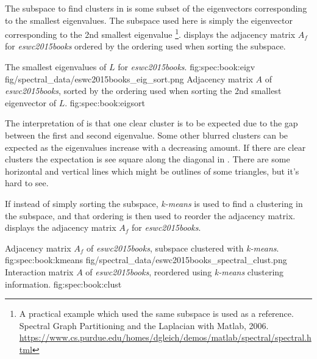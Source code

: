 The subspace to find clusters in is some subset of the eigenvectors corresponding to the smallest eigenvalues. The subspace used here is simply the eigenvector corresponding to the 2nd smallest eigenvalue \footnote{A practical example which used the same subspace is used as a reference. \\
Spectral Graph Partitioning and the Laplacian with Matlab, 2006. \\
\url{https://www.cs.purdue.edu/homes/dgleich/demos/matlab/spectral/spectral.html}
}.
 displays the adjacency matrix $A_f$ for \textit{eswc2015books} ordered by the ordering used when sorting the subspace. 


\FloatBarrier

{The smallest eigenvalues of $L$ for \textit{eswc2015books}.}
{fig:spec:book:eigv}
{fig/spectral_data/eswc2015books_eig_sort.png}
{Adjacency matrix $A$ of \textit{eswc2015books}, sorted by the ordering used when sorting the 2nd smallest eigenvector of $L$.}
{fig:spec:book:eigsort}

The interpretation of  is that one clear cluster is to be expected due to the gap between the first and second eigenvalue. Some other blurred clusters can be expected as the eigenvalues increase with a decreasing amount. If there are clear clusters the expectation is see square along the diagonal in . There are some horizontal and vertical lines which might be outlines of some triangles, but it's hard to see.

If instead of simply sorting the subspace, \textit{k-means} is used to find a clustering in the subspace, and that ordering is then used to reorder the adjacency matrix.  displays the adjacency matrix $A_f$ for \textit{eswc2015books}. 

\FloatBarrier

{Adjacency matrix $A_f$ of \textit{eswc2015books}, subspace clustered with \textit{k-means}.}
{fig:spec:book:kmeans}
{fig/spectral_data/eswc2015books_spectral_clust.png}
{Interaction matrix $A$ of \textit{eswc2015books}, reordered using \textit{k-means} clustering information.}
{fig:spec:book:clust}

